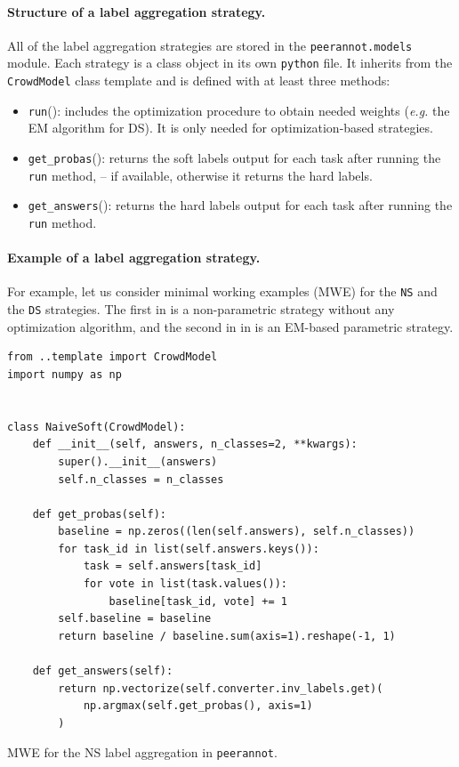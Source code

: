 \paragraph{Structure of a label aggregation strategy.}

All of the label aggregation strategies are stored in the \texttt{peerannot.models} module.
Each strategy is a class object in its own \texttt{python} file.
It inherits from the \texttt{CrowdModel} class template and is defined with at least three methods:
\begin{itemize}
    \item \texttt{run}(): includes the optimization procedure to obtain needed weights (\emph{e.g.} the EM algorithm for DS). It is only needed for optimization-based strategies.
    \item \texttt{get\_probas}(): returns the soft labels output for each task after running the \texttt{run} method, -- if available, otherwise it returns the hard labels.
    \item \texttt{get\_answers}(): returns the hard labels output for each task after running the \texttt{run} method.
\end{itemize}

\paragraph{Example of a label aggregation strategy.}

For example, let us consider minimal working examples (MWE) for the \texttt{NS} and the \texttt{DS} strategies.
The first in  is a non-parametric strategy without any optimization algorithm, and the second in  in  is an EM-based parametric strategy.

\begin{listing}[ht]
\begin{verbatim}
from ..template import CrowdModel
import numpy as np


class NaiveSoft(CrowdModel):
    def __init__(self, answers, n_classes=2, **kwargs):
        super().__init__(answers)
        self.n_classes = n_classes

    def get_probas(self):
        baseline = np.zeros((len(self.answers), self.n_classes))
        for task_id in list(self.answers.keys()):
            task = self.answers[task_id]
            for vote in list(task.values()):
                baseline[task_id, vote] += 1
        self.baseline = baseline
        return baseline / baseline.sum(axis=1).reshape(-1, 1)

    def get_answers(self):
        return np.vectorize(self.converter.inv_labels.get)(
            np.argmax(self.get_probas(), axis=1)
        )
\end{verbatim}
\caption{MWE for the NS label aggregation in \texttt{peerannot}.}
\label{listing:NS}
\end{listing}

